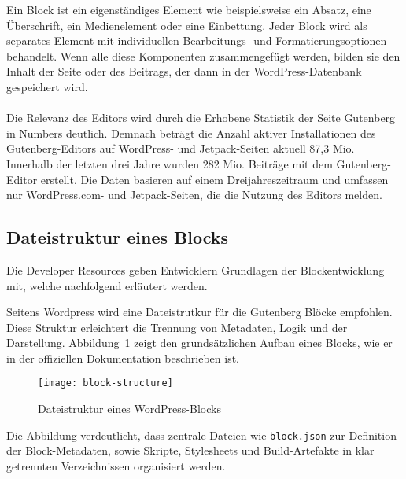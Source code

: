 Ein Block ist ein eigenständiges Element wie beispielsweise ein Absatz, eine Überschrift, ein Medienelement oder eine Einbettung.
Jeder Block wird als separates Element mit individuellen Bearbeitungs- und Formatierungsoptionen behandelt.
Wenn alle diese Komponenten zusammengefügt werden, bilden sie den Inhalt der Seite oder des Beitrags, der dann in der WordPress-Datenbank gespeichert wird.
\\
\\
Die Relevanz des Editors wird durch die Erhobene Statistik der Seite Gutenberg in Numbers deutlich.
Demnach beträgt die Anzahl aktiver Installationen des Gutenberg-Editors auf WordPress- und Jetpack-Seiten aktuell 87,3 Mio.
Innerhalb der letzten drei Jahre wurden 282 Mio. Beiträge mit dem Gutenberg-Editor erstellt.
Die Daten basieren auf einem Dreijahreszeitraum und umfassen nur WordPress.com- und Jetpack-Seiten, die die Nutzung des Editors melden. \cite{gutenstats}

\subsection{Dateistruktur eines Blocks}
Die Developer Resources geben Entwicklern Grundlagen der Blockentwicklung mit, welche nachfolgend erläutert werden.

Seitens Wordpress wird eine Dateistrutkur für die Gutenberg Blöcke empfohlen.
Diese Struktur erleichtert die Trennung von Metadaten, Logik und der Darstellung.
Abbildung~\ref{fig:block-structure} zeigt den grundsätzlichen Aufbau eines Blocks, wie er in der offiziellen Dokumentation beschrieben ist.

\begin{figure}[h!]
    \centering
    \texttt{[image: block-structure]} %
    \caption{Dateistruktur eines WordPress-Blocks \cite{wordpress2023}}
    \label{fig:block-structure}
\end{figure}
Die Abbildung verdeutlicht, dass zentrale Dateien wie \texttt{block.json} zur Definition der Block-Metadaten,
sowie Skripte, Stylesheets und Build-Artefakte in klar getrennten Verzeichnissen organisiert werden.



